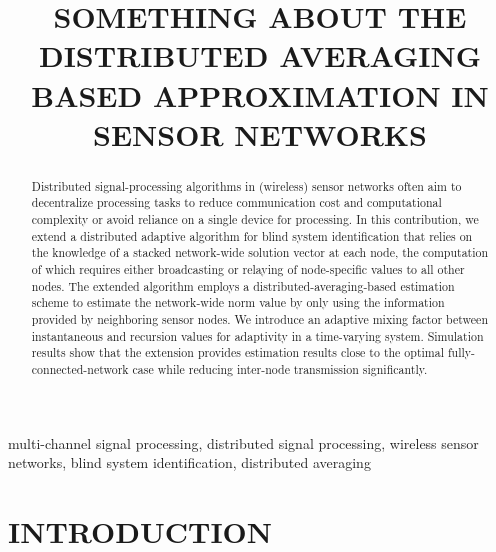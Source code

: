 \documentclass{article}
\title{SOMETHING ABOUT THE DISTRIBUTED AVERAGING BASED APPROXIMATION IN SENSOR NETWORKS}
\begin{document}
\ninept
%
\maketitle
%
\begin{abstract}
    Distributed signal-processing algorithms in (wireless) sensor networks often aim to decentralize processing tasks to reduce communication cost and computational complexity or avoid reliance on a single device for processing.
    In this contribution, we extend a distributed adaptive algorithm for blind system identification that relies on the knowledge of a stacked network-wide solution vector at each node, the computation of which requires either broadcasting or relaying of node-specific values to all other nodes.
    The extended algorithm employs a distributed-averaging-based estimation scheme to estimate the network-wide norm value by only using the information provided by neighboring sensor nodes.
    We introduce an adaptive mixing factor between instantaneous and recursion values for adaptivity in a time-varying system.
    Simulation results show that the extension provides estimation results close to the optimal fully-connected-network case while reducing inter-node transmission significantly.
\end{abstract}
%
\begin{keywords}
multi-channel signal processing, distributed signal processing, wireless sensor networks, blind system identification, distributed averaging
\end{keywords}
%
\section{INTRODUCTION}
\label{sec:intro}
\end{document}
